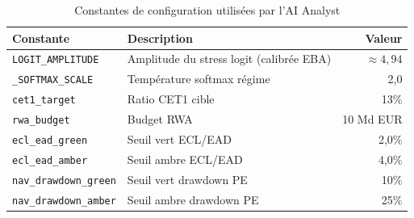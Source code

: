 \documentclass[12pt,a4paper]{article}
\begin{document}
\begin{table}[htbp]
\centering
\caption{Constantes de configuration utilis\'ees par l'AI Analyst}
\begin{tabular}{llr}
\toprule
\textbf{Constante} & \textbf{Description} & \textbf{Valeur} \\
\midrule
\texttt{LOGIT\_AMPLITUDE} & Amplitude du stress logit (calibr\'ee EBA) & $\approx 4{,}94$ \\
\texttt{\_SOFTMAX\_SCALE} & Temp\'erature softmax r\'egime & 2,0 \\
\texttt{cet1\_target} & Ratio CET1 cible & 13\% \\
\texttt{rwa\_budget} & Budget RWA & 10 Md EUR \\
\texttt{ecl\_ead\_green} & Seuil vert ECL/EAD & 2,0\% \\
\texttt{ecl\_ead\_amber} & Seuil ambre ECL/EAD & 4,0\% \\
\texttt{nav\_drawdown\_green} & Seuil vert drawdown PE & 10\% \\
\texttt{nav\_drawdown\_amber} & Seuil ambre drawdown PE & 25\% \\
\bottomrule
\end{tabular}
\label{tab:constants}
\end{table}
\end{document}
